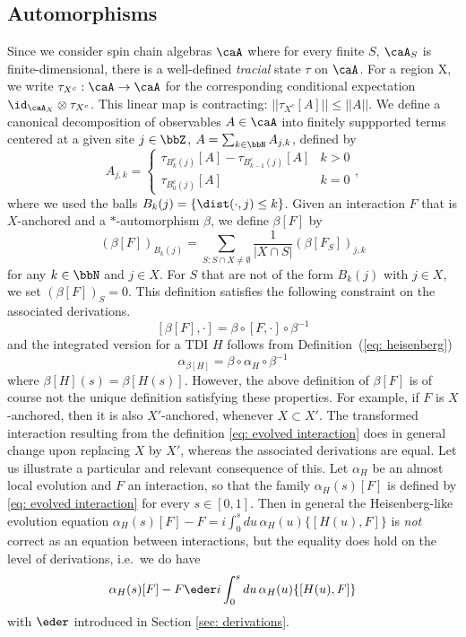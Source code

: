 \subsection{Automorphisms}\label{sec: automorphisms}
Since we consider spin chain algebras $\caA$ where for every finite $S$, $\caA_S$ is finite-dimensional, there is a well-defined \emph{tracial} state $\tau$ on $\caA$. For a region X, we write  $ \tau_{X^c}:\caA \to \caA$ for the corresponding conditional expectation $\id_{\caA_X}\otimes \tau_{X^c}$. This linear map is contracting:  $|| \tau_{X^c}[A] || \leq ||A||$.  We define a canonical decomposition of observables  $A\in\caA$ into finitely suppported terms centered at a given site $j \in\bbZ$, $A=\sum_{k\in\bbN} A_{j,k}$, defined by 
\begin{equation}\label{eq: decomposition finite}
	A_{j,k}=\begin{cases}  \tau_{B^c_{k}(j)}[A]- \tau_{B^c_{k-1}(j)} [A]  &  k>0  \\
		\tau_{B^c_{0}(j)}[A] & k=0
	\end{cases},
\end{equation}
where we used the balls $B_k(j)=\{  \dist(\cdot,j)\leq k\}$. 
Given an interaction $F$ that is $X$-anchored and a $*$-automorphism $\beta$, we define $\beta[F]$ by
\begin{equation} \label{eq: evolved interaction}
	(\beta[F])_{B_k(j)}=\sum_{S: S \cap X \neq \emptyset} \frac{1}{|X\cap S|}     (\beta[F_S])_{j,k}
\end{equation}
for any $k\in\bbN$ and $j\in X$. For $S$ that are not of the form $B_k(j)$ with $j\in X$, we set $(\beta[F])_{S}=0$. 
This definition satisfies the following constraint on the associated derivations. 
\begin{equation} \label{eq: commutation autos}
	[\beta[F],\cdot]= \beta \circ [F,\cdot] \circ \beta^{-1}
\end{equation}
and the integrated version for a TDI $H$ follows from Definition~(\ref{eq: heisenberg})
\begin{equation} \label{eq: commutation autos integrated}
	\alpha_{\beta[H]}= \beta \circ \alpha_H \circ \beta^{-1}
\end{equation}
where $\beta[H](s)=\beta[H(s)]$. 
However, the above definition of $\beta[F]$ is of course not the unique definition satisfying these properties. For example, if $F$ is $X$-anchored, then it is also $X'$-anchored, whenever $ X\subset X'$. The transformed interaction resulting  from the definition \eqref{eq: evolved interaction} does in general change upon replacing $X$ by $X'$, whereas the associated derivations are equal.  
Let us illustrate a particular  and relevant consequence of this. Let $\alpha_H$ be an almost local evolution and $F$ an interaction, so that the family 
$\alpha_H(s)[F]$ is defined by \eqref{eq: evolved interaction} for every $s\in [0,1]$.  Then in general the Heisenberg-like evolution equation $
\alpha_H(s)[F] - F=  i\int_{0}^{s}  du \,   \alpha_H(u) \{[H(u),F]\}
$ 
is \emph{not} correct as an equation between interactions, but the equality does hold on the level of derivations, i.e.\ we do have
$$
\alpha_H(s)[F] - F \eder  i\int_{0}^{s} du  \,  \alpha_H(u)  \{[H(u),F]\}
$$ 
with $\eder$ introduced in Section \ref{sec: derivations}. 


